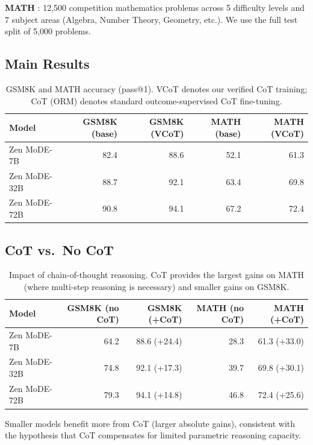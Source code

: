 \documentclass[11pt,a4paper]{article}
\begin{document}
\textbf{MATH} \cite{hendrycks2021math}: 12,500 competition mathematics problems across
5 difficulty levels and 7 subject areas (Algebra, Number Theory, Geometry, etc.).
We use the full test split of 5,000 problems.

\subsection{Main Results}

\begin{table}[H]
\centering
\caption{GSM8K and MATH accuracy (pass@1). VCoT denotes our verified CoT training;
CoT (ORM) denotes standard outcome-supervised CoT fine-tuning.}
\begin{tabular}{lrrrr}
\toprule
\textbf{Model} & \textbf{GSM8K (base)} & \textbf{GSM8K (VCoT)} & \textbf{MATH (base)} & \textbf{MATH (VCoT)} \\
\midrule
Zen MoDE-7B  & 82.4 & 88.6 & 52.1 & 61.3 \\
Zen MoDE-32B & 88.7 & 92.1 & 63.4 & 69.8 \\
Zen MoDE-72B & 90.8 & 94.1 & 67.2 & 72.4 \\
\bottomrule
\end{tabular}
\label{tab:main}
\end{table}

\subsection{CoT vs.\ No CoT}

\begin{table}[H]
\centering
\caption{Impact of chain-of-thought reasoning. CoT provides the largest gains on
MATH (where multi-step reasoning is necessary) and smaller gains on GSM8K.}
\begin{tabular}{lrrrr}
\toprule
\textbf{Model} & \textbf{GSM8K (no CoT)} & \textbf{GSM8K (+CoT)} & \textbf{MATH (no CoT)} & \textbf{MATH (+CoT)} \\
\midrule
Zen MoDE-7B  & 64.2 & 88.6 (+24.4) & 28.3 & 61.3 (+33.0) \\
Zen MoDE-32B & 74.8 & 92.1 (+17.3) & 39.7 & 69.8 (+30.1) \\
Zen MoDE-72B & 79.3 & 94.1 (+14.8) & 46.8 & 72.4 (+25.6) \\
\bottomrule
\end{tabular}
\label{tab:cot_vs_nocot}
\end{table}

Smaller models benefit more from CoT (larger absolute gains), consistent with the
hypothesis that CoT compensates for limited parametric reasoning capacity.
\end{document}
